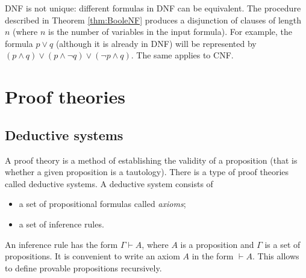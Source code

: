 \begin{page}
\setcounter{section}{2}
\setcounter{subsection}{0}
\setcounter{dfn}{20}
\label{portion:413}


DNF is not unique: different formulas in DNF can be equivalent.
The procedure described in Theorem \ref{thm:BooleNF} produces a disjunction of clauses of length $n$ (where $n$ is the number of variables in the input formula).
For example, the formula $p \vee q$ (although it is already in DNF) will be represented by $(p \wedge q) \vee (p \wedge \neg q) \vee (\neg p \wedge q)$.
The same applies to CNF.




\end{page}

\begin{page}
\setcounter{section}{2}
\setcounter{subsection}{1}
\setcounter{dfn}{0}
\label{portion:414}

\section{Proof theories}

\end{page}

\begin{page}
\setcounter{section}{2}
\setcounter{subsection}{1}
\setcounter{dfn}{0}
\label{portion:415}

\subsection{Deductive systems}
A proof theory is a method of establishing the validity of a proposition (that is whether a given proposition is a tautology).
There is a type of proof theories called deductive systems.
A deductive system consists of
\begin{itemize}
\item a set of propositional formulas called \emph{axioms};
\item a set of inference rules.
\end{itemize}

An inference rule has the form $\Gamma \vdash A$, where $A$ is a proposition and $\Gamma$ is a set of propositions.
It is convenient to write an axiom $A$ in the form $\vdash A$.
This allows to define provable propositions recursively.


\end{page}

